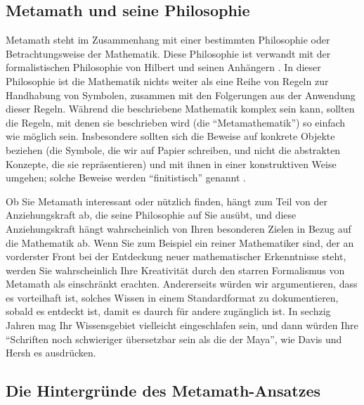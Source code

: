 
\subsection{Metamath und seine Philosophie}

Metamath steht im Zusammenhang mit einer bestimmten Philosophie oder Betrachtungsweise
der Mathematik. Diese Philosophie ist verwandt mit der formalistischen
Philosophie von Hilbert und seinen Anhängern
\cite[S.~1203--1208]{Kline}
\cite[S.~6]{Behnke}. In dieser Philosophie ist die Mathematik nichts weiter als eine Reihe von Regeln zur Handhabung von Symbolen, zusammen mit den Folgerungen aus der Anwendung dieser Regeln.  Während die beschriebene Mathematik komplex sein kann, sollten die Regeln, mit denen sie beschrieben wird (die "`Metamathematik"') so einfach wie möglich sein.
Insbesondere sollten sich die Beweise auf konkrete Objekte beziehen (die Symbole, die wir auf Papier schreiben, und nicht die abstrakten Konzepte, die sie repräsentieren) und mit ihnen in einer konstruktiven Weise umgehen; solche Beweise werden "`finitistisch"' genannt \cite[S.~2--3]{Shoenfield}.

Ob Sie Metamath interessant oder nützlich finden, hängt zum Teil von der Anziehungskraft ab, die seine Philosophie auf Sie ausübt, und diese Anziehungskraft hängt wahrscheinlich von Ihren besonderen Zielen in Bezug auf die Mathematik ab.  Wenn Sie zum Beispiel ein reiner Mathematiker sind, der an vorderster Front bei der Entdeckung neuer mathematischer Erkenntnisse steht, werden Sie wahrscheinlich Ihre
Kreativität durch den starren Formalismus von Metamath als einschränkt erachten.  Andererseits würden wir argumentieren, dass es vorteilhaft ist, solches Wissen in einem Standardformat zu dokumentieren, sobald es entdeckt ist, damit es daurch für andere zugänglich ist.  In sechzig Jahren mag Ihr Wissensgebiet vielleicht eingeschlafen sein, und dann würden Ihre "`Schriften noch schwieriger übersetzbar sein als die der Maya"', wie Davis und Hersh es ausdrücken\cite[S.~37]{Davis}.

\subsection{Die Hintergründe des Metamath-Ansatzes}

